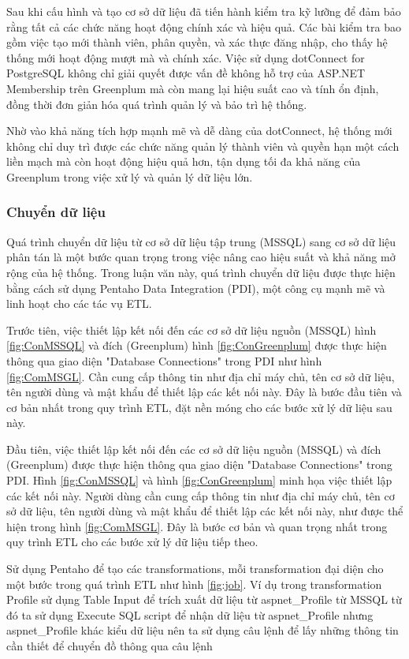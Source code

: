\documentclass{article}[14pt]
\begin{document}
Sau khi cấu hình và tạo cơ sở dữ liệu đã tiến hành kiểm tra kỹ lưỡng để đảm bảo rằng tất cả các chức năng hoạt động chính xác và hiệu quả. Các bài kiểm tra bao gồm việc tạo mới thành viên, phân quyền, và xác thực đăng nhập, cho thấy hệ thống mới hoạt động mượt mà và chính xác. Việc sử dụng dotConnect for PostgreSQL không chỉ giải quyết được vấn đề không hỗ trợ của ASP.NET Membership trên Greenplum mà còn mang lại hiệu suất cao và tính ổn định, đồng thời đơn giản hóa quá trình quản lý và bảo trì hệ thống.

Nhờ vào khả năng tích hợp mạnh mẽ và dễ dàng của dotConnect, hệ thống mới không chỉ duy trì được các chức năng quản lý thành viên và quyền hạn một cách liền mạch mà còn hoạt động hiệu quả hơn, tận dụng tối đa khả năng của Greenplum trong việc xử lý và quản lý dữ liệu lớn.

\subsubsection{Chuyển dữ liệu}

Quá trình chuyển dữ liệu từ cơ sở dữ liệu tập trung (MSSQL) sang cơ sở dữ liệu phân tán là một bước quan trọng trong việc nâng cao hiệu suất và khả năng mở rộng của hệ thống. Trong luận văn này, quá trình chuyển dữ liệu được thực hiện bằng cách sử dụng Pentaho Data Integration (PDI), một công cụ mạnh mẽ và linh hoạt cho các tác vụ ETL.

Trước tiên, việc thiết lập kết nối đến các cơ sở dữ liệu nguồn (MSSQL) hình \ref{fig:ConMSSQL} và đích (Greenplum) hình \ref{fig:ConGreenplum}  được thực hiện thông qua giao diện "Database Connections" trong PDI như hình \ref{fig:ComMSGL}. Cần cung cấp thông tin như địa chỉ máy chủ, tên cơ sở dữ liệu, tên người dùng và mật khẩu để thiết lập các kết nối này. Đây là bước đầu tiên và cơ bản nhất trong quy trình ETL, đặt nền móng cho các bước xử lý dữ liệu sau này.

Đầu tiên, việc thiết lập kết nối đến các cơ sở dữ liệu nguồn (MSSQL) và đích (Greenplum) được thực hiện thông qua giao diện "Database Connections" trong PDI. Hình \ref{fig:ConMSSQL} và hình \ref{fig:ConGreenplum} minh họa việc thiết lập các kết nối này. Người dùng cần cung cấp thông tin như địa chỉ máy chủ, tên cơ sở dữ liệu, tên người dùng và mật khẩu để thiết lập các kết nối này, như được thể hiện trong hình \ref{fig:ComMSGL}. Đây là bước cơ bản và quan trọng nhất trong quy trình ETL cho các bước xử lý dữ liệu tiếp theo.

Sử dụng Pentaho để tạo các transformations, mỗi transformation đại diện cho một bước trong quá trình ETL như hình \ref{fig:job}. Ví dụ trong transformation Profile sử dụng Table Input để trích xuất dữ liệu từ aspnet\_Profile từ MSSQL từ đó ta sử dụng Execute SQL script để nhận dữ liệu từ aspnet\_Profile nhưng aspnet\_Profile khác kiểu dữ liệu nên ta sử dụng câu lệnh để lấy những thông tin cần thiết để chuyển đồ thông qua câu lệnh
\end{document}
